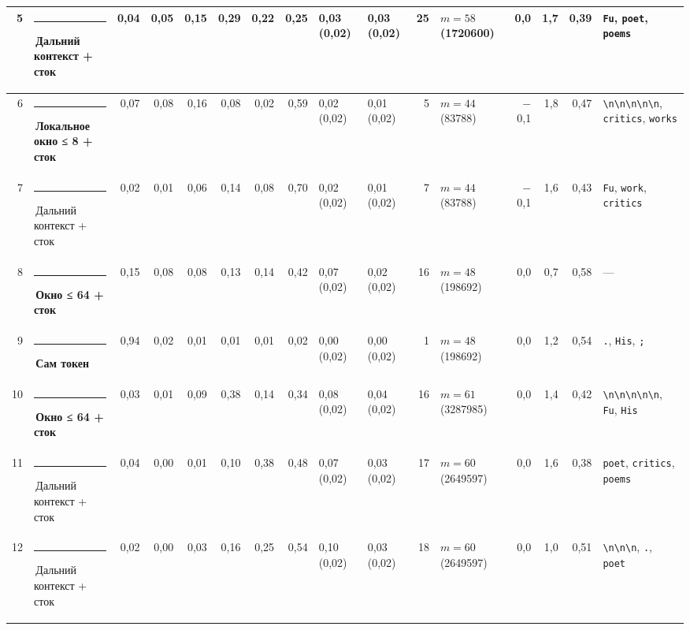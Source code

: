 \documentclass[10pt]{article}
\begin{document}
\begin{minipage}{\linewidth}
\begin{center}
{\begin{tabular}{|r|l|r|r|r|r|r|r|l|l|r|l|r|r|r|l|}
5 & \textcolor[HTML]{C3C2B7}{\rule{0.62em}{0.62em}}\,Дальний контекст + сток & 0,04 & 0,05 & 0,15 & 0,29 & 0,22 & 0,25 & 0,03 (0,02) & 0,03 (0,02) & 25 & $m{=}58$ (1720600) & 0,0 & 1,7 & 0,39 & \texttt{\textvisiblespace{}Fu}, \texttt{\textvisiblespace{}poet}, \texttt{\textvisiblespace{}poems} \\ \hline
6 & \textcolor[HTML]{1BAF7A}{\rule{0.62em}{0.62em}}\,\textbf{Локальное окно ≤ 8 + сток} & 0,07 & 0,08 & 0,16 & 0,08 & 0,02 & 0,59 & 0,02 (0,02) & 0,01 (0,02) & 5 & $m{=}44$ (83788) & $-$0,1 & 1,8 & 0,47 & \texttt{\textvisiblespace{}\textbackslash{}n\textbackslash{}n\textbackslash{}n\textbackslash{}n\textbackslash{}n}, \texttt{\textvisiblespace{}critics}, \texttt{\textvisiblespace{}works} \\ \hline
7 & \textcolor[HTML]{C3C2B7}{\rule{0.62em}{0.62em}}\,Дальний контекст + сток & 0,02 & 0,01 & 0,06 & 0,14 & 0,08 & 0,70 & 0,02 (0,02) & 0,01 (0,02) & 7 & $m{=}44$ (83788) & $-$0,1 & 1,6 & 0,43 & \texttt{\textvisiblespace{}Fu}, \texttt{\textvisiblespace{}work}, \texttt{\textvisiblespace{}critics} \\ \hline
8 & \textcolor[HTML]{EDA100}{\rule{0.62em}{0.62em}}\,\textbf{Окно ≤ 64 + сток} & 0,15 & 0,08 & 0,08 & 0,13 & 0,14 & 0,42 & 0,07 (0,02) & 0,02 (0,02) & 16 & $m{=}48$ (198692) & 0,0 & 0,7 & 0,58 & — \\ \hline
9 & \textcolor[HTML]{2A78D6}{\rule{0.62em}{0.62em}}\,\textbf{Сам токен} & 0,94 & 0,02 & 0,01 & 0,01 & 0,01 & 0,02 & 0,00 (0,02) & 0,00 (0,02) & 1 & $m{=}48$ (198692) & 0,0 & 1,2 & 0,54 & \texttt{\textvisiblespace{}.}, \texttt{\textvisiblespace{}His}, \texttt{\textvisiblespace{};} \\ \hline
10 & \textcolor[HTML]{EDA100}{\rule{0.62em}{0.62em}}\,\textbf{Окно ≤ 64 + сток} & 0,03 & 0,01 & 0,09 & 0,38 & 0,14 & 0,34 & 0,08 (0,02) & 0,04 (0,02) & 16 & $m{=}61$ (3287985) & 0,0 & 1,4 & 0,42 & \texttt{\textvisiblespace{}\textbackslash{}n\textbackslash{}n\textbackslash{}n\textbackslash{}n\textbackslash{}n}, \texttt{\textvisiblespace{}Fu}, \texttt{\textvisiblespace{}His} \\ \hline
11 & \textcolor[HTML]{C3C2B7}{\rule{0.62em}{0.62em}}\,Дальний контекст + сток & 0,04 & 0,00 & 0,01 & 0,10 & 0,38 & 0,48 & 0,07 (0,02) & 0,03 (0,02) & 17 & $m{=}60$ (2649597) & 0,0 & 1,6 & 0,38 & \texttt{\textvisiblespace{}poet}, \texttt{\textvisiblespace{}critics}, \texttt{\textvisiblespace{}poems} \\ \hline
12 & \textcolor[HTML]{C3C2B7}{\rule{0.62em}{0.62em}}\,Дальний контекст + сток & 0,02 & 0,00 & 0,03 & 0,16 & 0,25 & 0,54 & 0,10 (0,02) & 0,03 (0,02) & 18 & $m{=}60$ (2649597) & 0,0 & 1,0 & 0,51 & \texttt{\textvisiblespace{}\textbackslash{}n\textbackslash{}n\textbackslash{}n}, \texttt{\textvisiblespace{}.}, \texttt{\textvisiblespace{}poet} \\ \hline

\end{tabular}}
\end{center}
\end{minipage}
\end{document}
